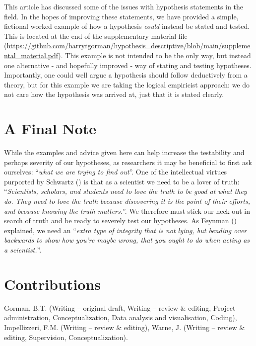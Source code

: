\documentclass[
]{article}
\begin{document}
This article has discussed some of the issues with hypothesis statements
in the field. In the hopes of improving these statements, we have
provided a simple, fictional worked example of how a hypothesis
\emph{could} instead be stated and tested. This is located at the end of
the supplementary material file
(\href{http://127.0.0.1:27181/\#0}{https://github.com/barrytgorman/hypothesis\_descriptive/blob/main/supplemental\_material.pdf}).
This example is not intended to be the only way, but instead one
alternative - and hopefully improved - way of stating and testing
hypotheses. Importantly, one could well argue a hypothesis should follow
deductively from a theory, but for this example we are taking the
logical empiricist approach: we do not care how the hypothesis was
arrived at, just that it is stated clearly.

\section{A Final Note}\label{a-final-note}

While the examples and advice given here can help increase the
testability and perhaps severity of our hypotheses, as researchers it
may be beneficial to first ask ourselves: ``\emph{what we are trying to
find out}''. One of the intellectual virtues purported by Schwartz
() is that as a
scientist we need to be a lover of truth: ``\emph{Scientists, scholars,
and students need to love the truth to be good at what they do. They
need to love the truth because discovering it is the point of their
efforts, and because knowing the truth matters.}''. We therefore must
stick our neck out in search of truth and be ready to severely test our
hypotheses. As Feynman () explained, we
need an ``\emph{extra type of integrity that is not lying, but bending
over backwards to show how you're maybe wrong, that you ought to do when
acting as a scientist.}''.

\pagebreak

\section{Contributions}\label{contributions}

Gorman, B.T. (Writing -- original draft, Writing -- review \& editing,
Project administration, Conceptualization, Data analysis and
visualisation, Coding), Impellizzeri, F.M. (Writing -- review \&
editing), Warne, J. (Writing -- review \& editing, Supervision,
Conceptualization).
\end{document}
